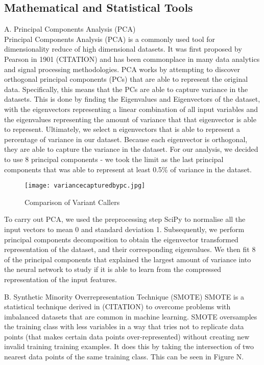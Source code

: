 \documentclass{article}
\begin{document}
\subsection{Mathematical and Statistical Tools}
A. Principal Components Analysis (PCA)\\
Principal Components Analysis (PCA) is a commonly used tool for dimensionality reduce of high dimensional datasets. It was first proposed by Pearson in 1901 (CITATION) and has been commonplace in many data analytics and signal processing methodologies. PCA works by attempting to discover orthogonal principal components (PCs) that are able to represent the original data. Specifically, this means that the PCs are able to capture variance in the datasets. This is done by finding the Eigenvalues and Eigenvectors of the dataset, with the eigenvectors representing a linear combination of all input variables and the eigenvalues representing the amount of variance that that eigenvector is able to represent. Ultimately, we select n eigenvectors that is able to represent a percentage of variance in our dataset. Because each eigenvector is orthogonal, they are able to capture the variance in the dataset. For our analysis, we decided to use 8 principal components - we took the limit as the last principal components that was able to represent at least 0.5\% of variance in the dataset.
 
\begin{figure}[H]
\texttt{[image: variancecapturedbypc.jpg]}
\caption{Comparison of Variant Callers}
\centering
\end{figure}

To carry out PCA, we used the preprocessing step SciPy to normalise all the input vectors to mean 0 and standard deviation 1. Subsequently, we perform principal components decomposition to obtain the eigenvector transformed representation of the dataset, and their corresponding eigenvalues. We then fit 8 of the principal components that explained the largest amount of variance into the neural network to study if it is able to learn from the compressed representation of the input features. 

B. Synthetic Minority Overrepresentation Technique (SMOTE)
SMOTE is a statistical technique derived in (CITATION) to overcome problems with imbalanced datasets that are common in machine learning. SMOTE oversamples the training class with less variables in a way that tries not to replicate data points (that makes certain data points over-represented) without creating new invalid training training examples. It does this by taking the intersection of two nearest data points of the same training class. This can be seen in Figure N. 
\end{document}
